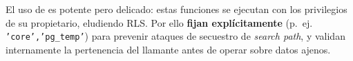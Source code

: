 \begin{AlertaSeguridad}
El uso de  es potente pero delicado: estas funciones se
ejecutan con los privilegios de su propietario, eludiendo RLS. Por ello \textbf{fijan
explícitamente}  (p.~ej. \texttt{'core','pg\_temp'}) para
prevenir ataques de secuestro de \textit{search path}, y validan internamente la
pertenencia del llamante antes de operar sobre datos ajenos.
\end{AlertaSeguridad}
